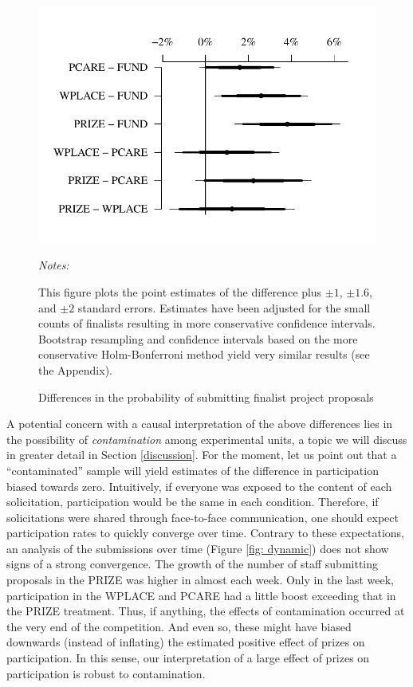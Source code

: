 \documentclass[12pt, titlepage]{article}
\newenvironment{tablenotes}[1][]{
  \begin{minipage}{\textwidth}\emph{Notes:}{\footnotesize #1}
}{\end{minipage}}
\begin{document}
\begin{figure} 
  \centering
  \caption{Differences in the probability of submitting finalist project proposals}
  \label{fig: finalist}
  \includegraphics{Figures/cplot-2.pdf}
  \begin{tablenotes}
  This figure plots the point estimates of the difference plus $\pm 1$, $\pm 1.6$, and $\pm 2$ standard errors. Estimates have been adjusted for the small counts of finalists \citep{agresti2000simple} resulting in more conservative confidence intervals. Bootstrap resampling and confidence intervals based on the more conservative Holm-Bonferroni method yield very similar results (see the Appendix).
  \end{tablenotes}
\end{figure}

A potential concern with a causal interpretation of the above
differences lies in the possibility of \emph{contamination} among
experimental units, a topic we will discuss in greater detail in Section
\ref{discussion}. For the moment, let us point out that a
``contaminated'' sample will yield estimates of the difference in
participation biased towards zero. Intuitively, if everyone was exposed
to the content of each solicitation, participation would be the same in
each condition. Therefore, if solicitations were shared through
face-to-face communication, one should expect participation rates to
quickly converge over time. Contrary to these expectations, an analysis
of the submissions over time (Figure \ref{fig: dynamic}) does not show
signs of a strong convergence. The growth of the number of staff
submitting proposals in the PRIZE was higher in almost each week. Only
in the last week, participation in the WPLACE and PCARE had a little
boost exceeding that in the PRIZE treatment. Thus, if anything, the
effects of contamination occurred at the very end of the competition.
And even so, these might have biased downwards (instead of inflating)
the estimated positive effect of prizes on participation. In this sense,
our interpretation of a large effect of prizes on participation is
robust to contamination.
\end{document}

